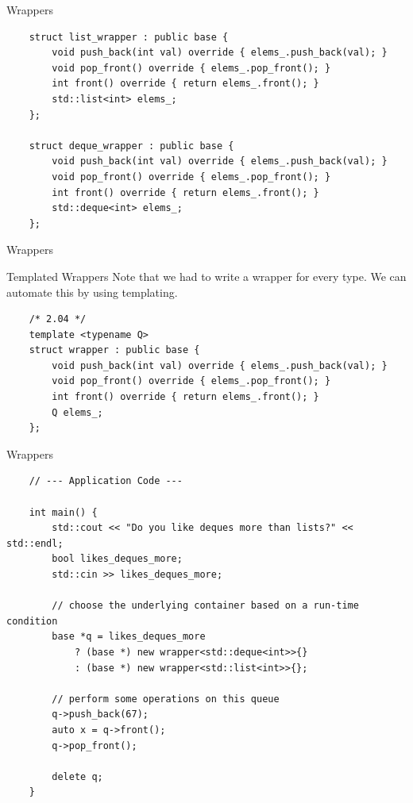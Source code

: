 \begin{frame}[fragile]{Wrappers}
  \begin{verbatim}
    struct list_wrapper : public base {
        void push_back(int val) override { elems_.push_back(val); }
        void pop_front() override { elems_.pop_front(); }
        int front() override { return elems_.front(); }
        std::list<int> elems_;
    };

    struct deque_wrapper : public base {
        void push_back(int val) override { elems_.push_back(val); }
        void pop_front() override { elems_.pop_front(); }
        int front() override { return elems_.front(); }
        std::deque<int> elems_;
    };
  \end{verbatim}
\end{frame}

\begin{frame}{Wrappers}
  
\end{frame}

\begin{frame}[fragile]{Templated Wrappers}
  Note that we had to write a wrapper for every type.
  We can automate this by using templating.
  \begin{verbatim}
    /* 2.04 */
    template <typename Q>
    struct wrapper : public base {
        void push_back(int val) override { elems_.push_back(val); }
        void pop_front() override { elems_.pop_front(); }
        int front() override { return elems_.front(); }
        Q elems_;
    };
  \end{verbatim}
\end{frame}

\begin{frame}[fragile]{Wrappers}
  \begin{verbatim}
    // --- Application Code ---

    int main() {
        std::cout << "Do you like deques more than lists?" << std::endl;
        bool likes_deques_more;
        std::cin >> likes_deques_more;

        // choose the underlying container based on a run-time condition
        base *q = likes_deques_more
            ? (base *) new wrapper<std::deque<int>>{}
            : (base *) new wrapper<std::list<int>>{};

        // perform some operations on this queue
        q->push_back(67);
        auto x = q->front();
        q->pop_front();

        delete q;
    }
  \end{verbatim}
\end{frame}

